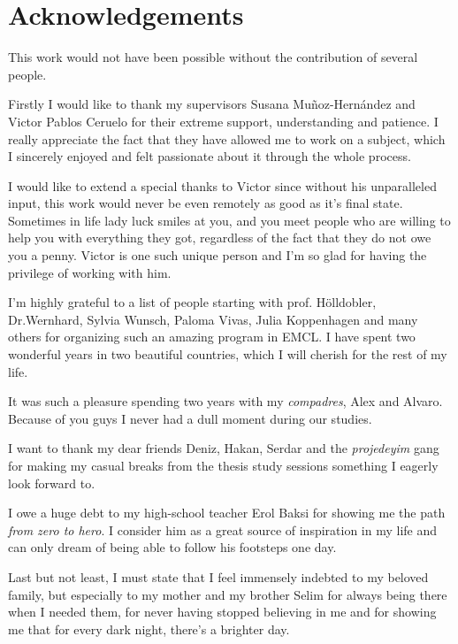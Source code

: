 \documentclass[egilmezThesis.tex]{subfiles}
\begin{document}
\chapter*{\centering \LARGE{Acknowledgements}}
\label{chap:Acknowledgements}


\small{This work would not have been possible without the contribution of several people.}

\small{Firstly I would like to thank my supervisors Susana Mu\~noz-Hern\'andez and Victor Pablos Ceruelo for their extreme support, understanding and patience. I really appreciate the fact that they have allowed me to work on a subject, which I sincerely enjoyed and felt passionate about it through the whole process. }

\small{I would like to extend a special thanks to Victor since without his unparalleled input, this work would never be even remotely as good as it's final state. Sometimes in life lady luck smiles at you, and you meet people who are willing to help you with everything they got, regardless of the fact that they do not owe you a penny. Victor is one such unique person and I'm so glad for having the privilege of working with him.}

\small{I'm highly grateful to a list of people starting with prof. H\"{o}lldobler, Dr.Wernhard, Sylvia Wunsch, Paloma Vivas, Julia Koppenhagen and many others for organizing such an amazing program in EMCL. I have spent two wonderful years in two beautiful countries, which I will cherish for the rest of my life.}

\small{It was such a pleasure spending two years with my \textit{compadres}, Alex and Alvaro. Because of you guys I never had a dull moment during our studies.}

\small{I want to thank my dear friends Deniz, Hakan, Serdar and the \textit{projedeyim} gang for making my casual breaks from the thesis study sessions something I eagerly look forward to.}

\small{I owe a huge debt to my high-school teacher Erol Baksi for showing me the path \textit{from zero to hero}. I consider him as a great source of inspiration in my life and can only dream of being able to follow his footsteps one day. }

\small{Last but not least, I must state that I feel immensely indebted to my beloved family, but especially to my mother and my brother Selim for always being there when I needed them, for never having stopped believing in me and for showing me that for every dark night, there's a brighter day.}
\end{document}
